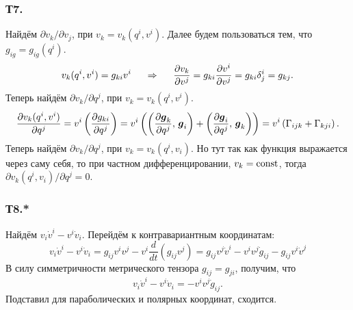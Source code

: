 \subsubsection*{Т7.}
Найдём $\partial v_k / \partial v_j$, при $v_k = v_k(q^i, v^i)$. Далее будем пользоваться тем, что $g_{ig} = g_{ig}(q^i)$.
$$
    v_k(q^i, v^i) = g_{ki} v^i 
    \hspace{0.5cm} \Rightarrow \hspace{0.5cm} 
    \frac{\partial v_k}{\partial v^j} = g_{ki} \frac{\partial v^i}{\partial v^j} = g_{ki} \delta^i_j = g_{kj}.
$$
Теперь найдём $\partial v_k / \partial q^j$, при $v_k = v_k(q^i, v^i)$. 
$$
    \frac{\partial v_k(q^i, v^i)}{\partial q^j} = v^i \left(
        \frac{\partial  g_{ki}}{\partial q^j} 
    \right) = v^i \left(
        \left(\frac{\partial \mbox{\boldmath $g$}_k}{\partial q^j}, \, \mbox{\boldmath $g$}_i \right) +
        \left(\frac{\partial \mbox{\boldmath $g$}_i}{\partial q^j}, \, \mbox{\boldmath $g$}_k\right)
    \right) = v^i\left(\Gamma_{ijk} + \Gamma_{kji}\right).
$$
Теперь найдём $\partial v_k / \partial q^j$, при $v_k = v_k(q^i, v_i)$. Но тут так как функция выражается через саму себя, то при частном дифференцировании, $v_k = \text{const}$, тогда $\partial v_k(q^i, v_i) / \partial q^j = 0$.



\subsubsection*{Т8.*}
Найдём $v_i \dot{v}^i - v^i \dot{v}_i$. Перейдём к контравариантным координатам:
$$
    v_i \dot{v}^i - v^i \dot{v}_i = g_{ij} v^i v^j - v^i \frac{d}{dt} \left(
             g_{ij} v^j
        \right) =    g_{ij} v^j \dot{v}^i  - v^i v^j \dot{g}_{ij} - g_{ij} v^i \dot{v}^j
$$
В силу симметричности метрического тензора $g_{ij}=g_{ji}$, получим, что
$$
    v_i \dot{v}^i - v^i \dot{v}_i =  - v^i v^j \dot{g}_{ij}.
$$
Подставил для параболических и полярных координат, сходится.

